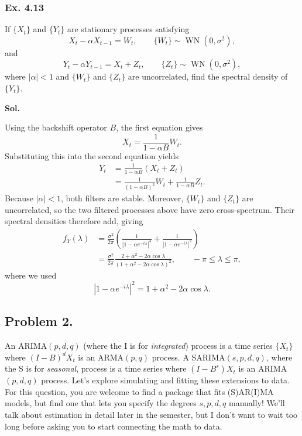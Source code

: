 \documentclass[lang=en,11pt,a4paper,citestyle =authoryear]{elegantpaper}
\begin{document}
\subsubsection*{Ex. 4.13}
If $\{X_t\}$ and $\{Y_t\}$ are stationary processes satisfying
\[
X_t-\alpha X_{t-1}=W_t,
\qquad \{W_t\}\sim\operatorname{WN}(0,\sigma^2),
\]
and
\[
Y_t-\alpha Y_{t-1}=X_t+Z_t,
\qquad \{Z_t\}\sim\operatorname{WN}(0,\sigma^2),
\]
where $|\alpha|<1$ and $\{W_t\}$ and $\{Z_t\}$ are uncorrelated, find the
spectral density of $\{Y_t\}$.
\par\vspace{0.5em}
\textbf{Sol.}\par
Using the backshift operator $B$, the first equation gives
\[
X_t=\frac{1}{1-\alpha B}W_t.
\]
Substituting this into the second equation yields
\begin{align*}
Y_t
&=\frac{1}{1-\alpha B}(X_t+Z_t)\\
&=\frac{1}{(1-\alpha B)^2}W_t
  +\frac{1}{1-\alpha B}Z_t.
\end{align*}
Because $|\alpha|<1$, both filters are stable. Moreover, $\{W_t\}$ and
$\{Z_t\}$ are uncorrelated, so the two filtered processes above have zero
cross-spectrum. Their spectral densities therefore add, giving
\begin{align*}
f_Y(\lambda)
&=\frac{\sigma^2}{2\pi}
  \left(
  \frac{1}{|1-\alpha e^{-i\lambda}|^4}
  +\frac{1}{|1-\alpha e^{-i\lambda}|^2}
  \right)\\
&=\frac{\sigma^2}{2\pi}
  \frac{2+\alpha^2-2\alpha\cos\lambda}
       {(1+\alpha^2-2\alpha\cos\lambda)^2},
\qquad -\pi\leq\lambda\leq\pi,
\end{align*}
where we used
\[
|1-\alpha e^{-i\lambda}|^2
=1+\alpha^2-2\alpha\cos\lambda.
\]
\vspace{1em}

\newpage
\subsection*{Problem 2.}
An ARIMA$(p,d,q)$ (where the I is for \textit{integrated}) process is a time series $\{X_t\}$ where $(I-B)^dX_t$ is an ARMA$(p,q)$ process. A SARIMA$(s,p,d,q)$, where the S is for \textit{seasonal}, process is a time series where $(I-B^s)X_t$ is an ARIMA$(p,d,q)$ process. Let's explore simulating and fitting these extensions to data. For this question, you are welcome to find a package that fits (S)AR(I)MA models, but find one that lets you specify the degrees $s,p,d,q$ manually! We'll talk about estimation in detail later in the semester, but I don't want to wait too long before asking you to start connecting the math to data.
\end{document}

